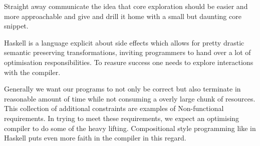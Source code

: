 Straight away communicate the idea that core exploration should be easier and more approachable and give
and drill it home with a small but daunting core snippet.
 
Haskell is a language explicit about side effects which allows for pretty drastic semantic preserving transformations,
inviting programmers to hand over a lot of optimisation responsibilities. To reasure success one needs to explore
interactions with the compiler.

Generally we want our programs to not only be correct but also terminate in reasonable amount of time while
not consuming a overly large chunk of resources. This collection of additional constraints are examples of 
Non-functional requirements. In trying to meet these requirements, we expect an optimising compiler
to do some of the heavy lifting. Compositional style programming like in Haskell puts even more
faith in the compiler in this regard.
